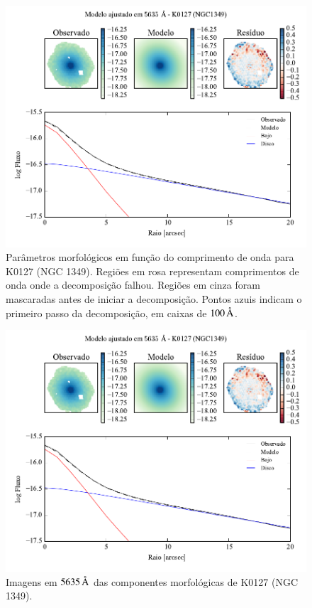 \begin{figure}
	\includegraphics[page=2]{figuras-decomp/K0127_sample006a}
	\caption[Parâmetros morfológicos em função do comprimento de onda de K0127
	(NGC 1349)]
	{Parâmetros morfológicos em função do comprimento de onda para
	K0127 (NGC 1349). Regiões em rosa representam comprimentos de onda onde a
	decomposição falhou. Regiões em cinza foram mascaradas antes de iniciar a
	decomposição. Pontos azuis indicam o primeiro passo da decomposição, em caixas
	de $100\,\text{\normalfont\AA}$.}
	\label{fig:decompParams:K0127}
\end{figure}

\begin{figure}
	\includegraphics[page=3]{figuras-decomp/K0127_sample006a}
	\caption[Imagens em $5635\,\angstrom$ das componentes morfológicas de K0127
	(NGC 1349)]
	{Imagens em $5635\,\angstrom$ das componentes morfológicas de K0127
	(NGC 1349).}
	\label{fig:decompImages:K0127}
\end{figure}

